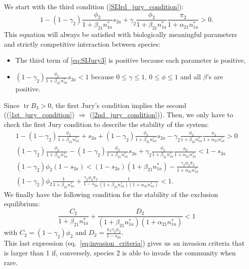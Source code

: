 \documentclass{article}
\DeclareMathOperator{\tr}{tr}
\begin{document}
We start with the third condition (\ref{SI3rd_jury_condition}):
\begin{equation}\label{eq:SIJury3}
    1- (1-\gamma_2)\frac{\phi_2}{1+\beta_{21}n_{1a}^*}s_{2a} + \gamma_2\frac{\phi_2}{1+\beta_{21}n_{1a}^*}\frac{\pi_2}{1+\alpha_{21}n_{1a}^*} > 0.
\end{equation}
This equation will always be satisfied with biologically meaningful parameters and strictly competitive interaction between species: 
\begin{itemize}
    \item The third term of \eqref{eq:SIJury3} is positive because each parameter is positive,
    \item $(1-\gamma_2)\frac{\phi_2}{1+\beta_{21}n_{1a}^*}s_{2a} < 1$ because $0 \leq \gamma \leq 1$, $0 \leq \phi \leq 1$ and all $\beta$'s are positive.
\end{itemize}
Since $\tr B_3 > 0$, the first Jury's condition implies the second ((\ref{1st_jury_condition}) $\Rightarrow$ (\ref{2nd_jury_condition})). Then, we only have to check the first Jury condition to describe the stability of the system:
\begin{align*}
    1-(1-\gamma_2)\frac{\phi_2}{1+\beta_{21}n_{1a}^*} + s_{2a}+(1-\gamma_2)\frac{\phi_2}{1+\beta_{21}n_{1a}^*}s_{2a} - \gamma_2\frac{\phi_2}{1+\beta_{21}n_{1a}^*}\frac{\pi_2}{1+\alpha_{21}n_{1a}^*} > 0 \\
    (1-\gamma_2)\frac{\phi_2}{1+\beta_{21}n_{1a}^*} - (1-\gamma_2)\frac{\phi_2}{1+\beta_{21}n_{1a}^*}s_{2a} + \gamma_2\frac{\phi_2}{1+\beta_{21}n_{1a}^*}\frac{\pi_2}{1+\alpha_{21}n_{1a}^*} < 1-s_{2a}\\
    (1-\gamma_2)\phi_2(1-s_{2a}) < (1-s_{2a})(1+\beta_{21}n_{1a}^*)- \frac{\gamma_2\phi_2\pi_2}{1+\alpha_{21}n_{1a}^*}\\
    (1-\gamma_2)\phi_2\frac{1}{1+\beta_{21}n_{1a}^*} + \frac{\gamma_2\phi_2\pi_2}{1-s_{2a}}\frac{1}{(1+\beta_{21}n_{1a}^*)(1+\alpha_{21}n_{1a}^*)} < 1.
\end{align*}
We finally have the following condition for the stability of the exclusion equilibrium:
\begin{equation}
    \frac{C_2}{1+\beta_{21}n_{1a}^*}+\frac{D_2}{(1+\beta_{21}n_{1a}^*)(1+\alpha_{21}n_{1a}^*)} < 1
\end{equation}
with $C_2= (1-\gamma_2)\phi_2$ and $D_2= \frac{\pi_2\gamma_2\phi_2}{1-s_{2a}}$.\\

This last expression (eq.~\ref{eq:invasion_criteria}) gives us an invasion criteria that is larger than 1 if, conversely, species 2 is able to invade the community when rare.
\end{document}
